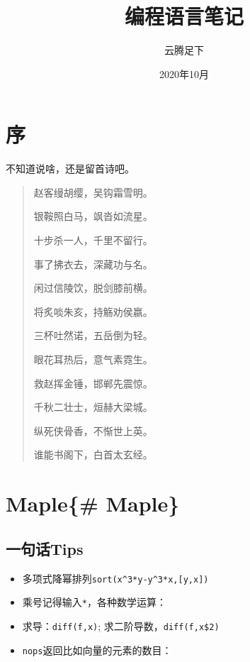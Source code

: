 \documentclass[
]{book}
\title{编程语言笔记}
\author{云腾足下}
\date{2020年10月}
\providecommand{\tightlist}{%
  \setlength{\itemsep}{0pt}\setlength{\parskip}{0pt}}
\begin{document}
\maketitle

{
\setcounter{tocdepth}{1}
\tableofcontents
}
\hypertarget{ux5e8f}{%
\chapter*{序}\label{ux5e8f}}

不知道说啥，还是留首诗吧。

\begin{quote}
赵客缦胡缨，吴钩霜雪明。

银鞍照白马，飒沓如流星。

十步杀一人，千里不留行。

事了拂衣去，深藏功与名。

闲过信陵饮，脱剑膝前横。

将炙啖朱亥，持觞劝侯嬴。

三杯吐然诺，五岳倒为轻。

眼花耳热后，意气素霓生。

救赵挥金锤，邯郸先震惊。

千秋二壮士，烜赫大梁城。

纵死侠骨香，不惭世上英。

谁能书阁下，白首太玄经。
\end{quote}

\hypertarget{maple-maple}{%
\chapter{Maple\{\# Maple\}}\label{maple-maple}}

\hypertarget{ux4e00ux53e5ux8bddtips}{%
\section{一句话Tips}\label{ux4e00ux53e5ux8bddtips}}

\begin{itemize}
\tightlist
\item
  多项式降幂排列\texttt{sort(x\^{}3*y-y\^{}3*x,{[}y,x{]})}
\item
  乘号记得输入\texttt{*}，各种数学运算：
\item
  求导：\texttt{diff(f,x)}; 求二阶导数，\texttt{diff(f,x\$2)}
\item
  \texttt{nops}返回比如向量的元素的数目：
\end{itemize}
\end{document}
